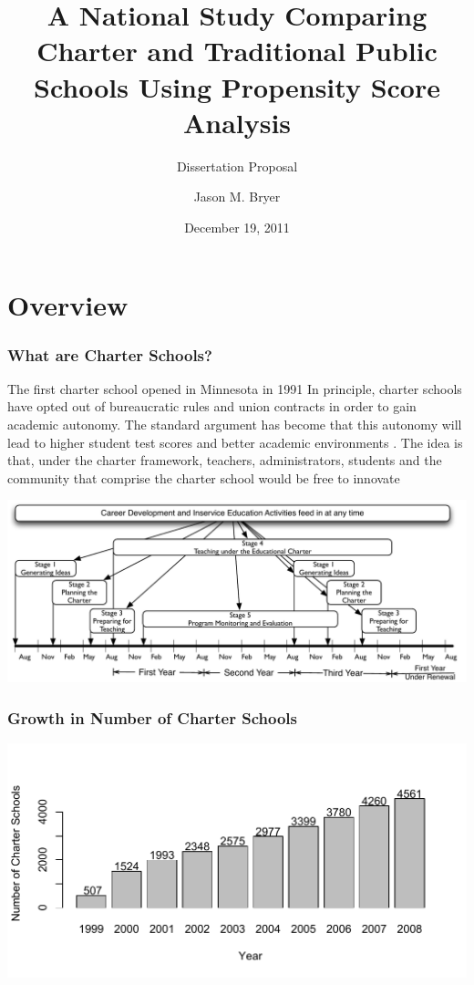 \documentclass[10pt,slidestop,mathserif]{beamer}
\title[Dissertation Proposal]{A National Study Comparing Charter and Traditional Public Schools Using Propensity Score Analysis}
\subtitle{Dissertation Proposal}
\author[Bryer]{Jason M. Bryer}
\institute[University at Albany]{Division of Educational Psychology \& Methodology\\University at Albany}
\date{December 19, 2011}
\begin{document}
\frame{\titlepage}

\section{Overview}

\begin{frame}
	\frametitle{What are Charter Schools?}
	The first charter school opened in Minnesota in 1991
	In principle, charter schools have opted out of bureaucratic rules and union contracts in order to gain academic autonomy. The standard argument has become that this autonomy will lead to higher student test scores and better academic environments \cite{Wells2002}. The idea is that, under the charter framework, teachers, administrators, students and the community that comprise the charter school would be free to innovate
	
	\includegraphics[width=\textwidth]{../Figures/Timeline.pdf}
	
	\small \cite<Adapted from>{Budde1988}
\end{frame}

\begin{frame}[c]
	\frametitle{Growth in Number of Charter Schools}
	\includegraphics[width=\textwidth]{../Figures/CharterSchoolGrowth.pdf}
\end{frame}
\end{document}
